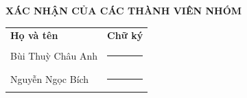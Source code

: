 \documentclass[13pt, a4paper, oneside]{extbook}
\newcommand{\TenA}{Bùi Thuỳ Châu Anh}
\newcommand{\TenB}{Nguyễn Ngọc Bích}
\renewcommand{\arraystretch}{1.25}
\numberwithin{subsection}{section}
\theoremstyle{plain}
\theoremstyle{definition}
\theoremstyle{remark}
\begin{document}
\newpage

\begin{center}
    \textbf{\Large XÁC NHẬN CỦA CÁC THÀNH VIÊN NHÓM}
\end{center}

\vspace{1.5cm} %

\noindent
{%
\renewcommand{\arraystretch}{3.5} %
\begin{tabular}{@{}p{8cm} l@{}}
    \textbf{Họ và tên} & \textbf{Chữ ký} \\
    \TenA & \rule{6cm}{0.5pt} \\
    \TenB & \rule{6cm}{0.5pt}
\end{tabular}%
}

\newpage

\setcounter{tocdepth}{1} %
\baselineskip 0.6cm
\tableofcontents
\newpage
\setlength{\cftfignumwidth}{1.8cm}
\setlength{\cfttabnumwidth}{1.8cm}
\renewcommand{\cftfigpresnum}{Hình~}
\renewcommand{\cfttabpresnum}{Bảng~}
\listoffigures
\newpage
\listoftables
\newpage






\end{document}
